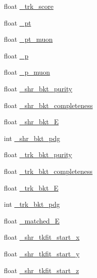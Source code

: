 \begin{DoxyCompactItemize}
\item 
float \hyperlink{classselection_1_1NuMuSelection_a2316596a59c6b87ea5aa75716c588117}{\+\_\+trk\+\_\+score}
\item 
float \hyperlink{classselection_1_1NuMuSelection_aab5bb47332ae2489a5ab96078397d075}{\+\_\+pt}
\item 
float \hyperlink{classselection_1_1NuMuSelection_abcba7cd55395fa3ae3822f84abad4d73}{\+\_\+pt\+\_\+muon}
\item 
float \hyperlink{classselection_1_1NuMuSelection_a821979901c138eca118246a1eeedcd80}{\+\_\+p}
\item 
float \hyperlink{classselection_1_1NuMuSelection_a94f9c7445dc565e03c899633f031250d}{\+\_\+p\+\_\+muon}
\item 
float \hyperlink{classselection_1_1NuMuSelection_a6988cb9e869c0205f44659b3a65bd047}{\+\_\+shr\+\_\+bkt\+\_\+purity}
\item 
float \hyperlink{classselection_1_1NuMuSelection_a18224668e51654b8322757c2db5d8b9d}{\+\_\+shr\+\_\+bkt\+\_\+completeness}
\item 
float \hyperlink{classselection_1_1NuMuSelection_aa6e475979c9554cb14bf7a082385a128}{\+\_\+shr\+\_\+bkt\+\_\+E}
\item 
int \hyperlink{classselection_1_1NuMuSelection_ab5695d0d13afa6fe27e38b63951ade58}{\+\_\+shr\+\_\+bkt\+\_\+pdg}
\item 
float \hyperlink{classselection_1_1NuMuSelection_a72c22e0de99d58873fa4e9824e094c50}{\+\_\+trk\+\_\+bkt\+\_\+purity}
\item 
float \hyperlink{classselection_1_1NuMuSelection_a569e5b1199f57a2becbd28ee0202baae}{\+\_\+trk\+\_\+bkt\+\_\+completeness}
\item 
float \hyperlink{classselection_1_1NuMuSelection_a1957763f4a43de544b42a9e04cf83afa}{\+\_\+trk\+\_\+bkt\+\_\+E}
\item 
int \hyperlink{classselection_1_1NuMuSelection_afc6475990e683ff735846740580cac9b}{\+\_\+trk\+\_\+bkt\+\_\+pdg}
\item 
float \hyperlink{classselection_1_1NuMuSelection_a47c185ab6ea19a597c0d049359e851e1}{\+\_\+matched\+\_\+E}
\item 
float \hyperlink{classselection_1_1NuMuSelection_a2e7f6e41acd96cb4ff217b1ec129884e}{\+\_\+shr\+\_\+tkfit\+\_\+start\+\_\+x}
\item 
float \hyperlink{classselection_1_1NuMuSelection_aced5ceef2d92e448cfed37ec3fb75ab4}{\+\_\+shr\+\_\+tkfit\+\_\+start\+\_\+y}
\item 
float \hyperlink{classselection_1_1NuMuSelection_a82f756e0a512e9b2ab45a0d2061d2ec3}{\+\_\+shr\+\_\+tkfit\+\_\+start\+\_\+z}

\end{DoxyCompactItemize}
